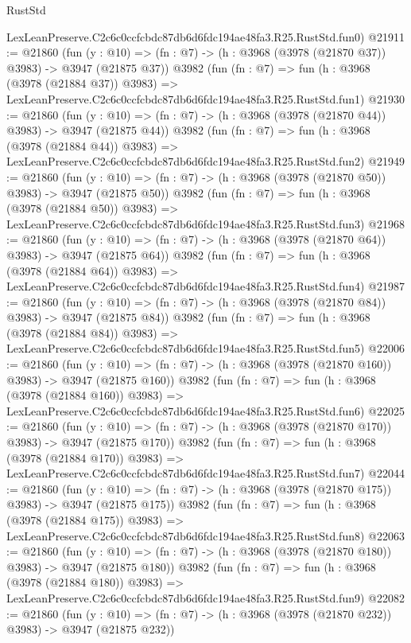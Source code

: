 \begin{lexlean}{RustStd}
\begin{coremodule}
    LexLeanPreserve.C2c6c0ccfcbdc87db6d6fdc194ae48fa3.R25.RustStd.fun0)
@21911 := @21860
    (fun (y : @10) => (fn : @7) -> (h : @3968 (@3978 (@21870 @37)) @3983) -> @3947 (@21875 @37))
    @3982
    (fun (fn : @7) =>
    fun (h : @3968 (@3978 (@21884 @37)) @3983) =>
    LexLeanPreserve.C2c6c0ccfcbdc87db6d6fdc194ae48fa3.R25.RustStd.fun1)
@21930 := @21860
    (fun (y : @10) => (fn : @7) -> (h : @3968 (@3978 (@21870 @44)) @3983) -> @3947 (@21875 @44))
    @3982
    (fun (fn : @7) =>
    fun (h : @3968 (@3978 (@21884 @44)) @3983) =>
    LexLeanPreserve.C2c6c0ccfcbdc87db6d6fdc194ae48fa3.R25.RustStd.fun2)
@21949 := @21860
    (fun (y : @10) => (fn : @7) -> (h : @3968 (@3978 (@21870 @50)) @3983) -> @3947 (@21875 @50))
    @3982
    (fun (fn : @7) =>
    fun (h : @3968 (@3978 (@21884 @50)) @3983) =>
    LexLeanPreserve.C2c6c0ccfcbdc87db6d6fdc194ae48fa3.R25.RustStd.fun3)
@21968 := @21860
    (fun (y : @10) => (fn : @7) -> (h : @3968 (@3978 (@21870 @64)) @3983) -> @3947 (@21875 @64))
    @3982
    (fun (fn : @7) =>
    fun (h : @3968 (@3978 (@21884 @64)) @3983) =>
    LexLeanPreserve.C2c6c0ccfcbdc87db6d6fdc194ae48fa3.R25.RustStd.fun4)
@21987 := @21860
    (fun (y : @10) => (fn : @7) -> (h : @3968 (@3978 (@21870 @84)) @3983) -> @3947 (@21875 @84))
    @3982
    (fun (fn : @7) =>
    fun (h : @3968 (@3978 (@21884 @84)) @3983) =>
    LexLeanPreserve.C2c6c0ccfcbdc87db6d6fdc194ae48fa3.R25.RustStd.fun5)
@22006 := @21860
    (fun (y : @10) => (fn : @7) -> (h : @3968 (@3978 (@21870 @160)) @3983) -> @3947 (@21875 @160))
    @3982
    (fun (fn : @7) =>
    fun (h : @3968 (@3978 (@21884 @160)) @3983) =>
    LexLeanPreserve.C2c6c0ccfcbdc87db6d6fdc194ae48fa3.R25.RustStd.fun6)
@22025 := @21860
    (fun (y : @10) => (fn : @7) -> (h : @3968 (@3978 (@21870 @170)) @3983) -> @3947 (@21875 @170))
    @3982
    (fun (fn : @7) =>
    fun (h : @3968 (@3978 (@21884 @170)) @3983) =>
    LexLeanPreserve.C2c6c0ccfcbdc87db6d6fdc194ae48fa3.R25.RustStd.fun7)
@22044 := @21860
    (fun (y : @10) => (fn : @7) -> (h : @3968 (@3978 (@21870 @175)) @3983) -> @3947 (@21875 @175))
    @3982
    (fun (fn : @7) =>
    fun (h : @3968 (@3978 (@21884 @175)) @3983) =>
    LexLeanPreserve.C2c6c0ccfcbdc87db6d6fdc194ae48fa3.R25.RustStd.fun8)
@22063 := @21860
    (fun (y : @10) => (fn : @7) -> (h : @3968 (@3978 (@21870 @180)) @3983) -> @3947 (@21875 @180))
    @3982
    (fun (fn : @7) =>
    fun (h : @3968 (@3978 (@21884 @180)) @3983) =>
    LexLeanPreserve.C2c6c0ccfcbdc87db6d6fdc194ae48fa3.R25.RustStd.fun9)
@22082 := @21860
    (fun (y : @10) => (fn : @7) -> (h : @3968 (@3978 (@21870 @232)) @3983) -> @3947 (@21875 @232))

\end{coremodule}
\end{lexlean}
